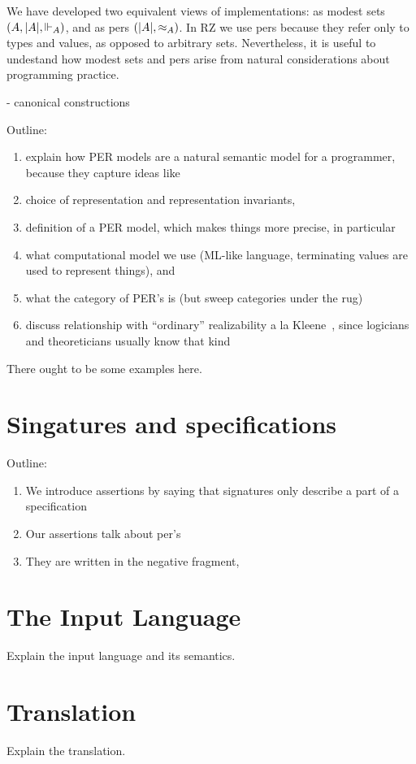 We have developed two equivalent views of implementations: as modest
sets $(A, |A|, {\Vdash_A})$, and as pers $(|A|, {\approx_A})$.
In RZ we use pers because they refer only to types and values, as
opposed to arbitrary sets. Nevertheless, it is useful to undestand how
modest sets and pers arise from natural considerations about
programming practice.

- canonical constructions



\bigskip\bigskip


Outline:
%
\begin{enumerate}
\item explain how PER models are a natural semantic model for a
  programmer, because they capture ideas like
\item choice of representation and representation invariants,
\item definition of a PER model, which makes things more precise, in
  particular
\item what computational model we use (ML-like language, terminating
  values are used to represent things), and
\item what the category of PER's is (but sweep categories under the
  rug)
\item discuss relationship with ``ordinary'' realizability a la
  Kleene~\cite{KleeneSC:intint}, since logicians and theoreticians
  usually know that kind
\end{enumerate}

There ought to be some examples here.

\section{Singatures and specifications}
\label{sec:sing-spec}

Outline:
%
\begin{enumerate}
\item We introduce assertions by saying that signatures only describe a
  part of a specification
\item Our assertions talk about per's
\item They are written in the negative fragment,
\end{enumerate}


\section{The Input Language}
\label{sec:input-language}

Explain the input language and its semantics.

\section{Translation}
\label{sec:translation}

Explain the translation.




